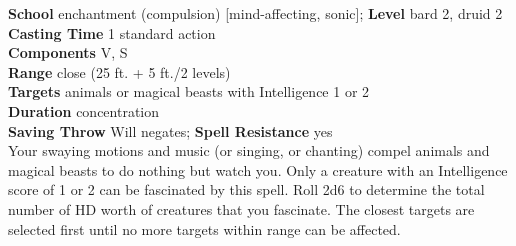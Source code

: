 \textbf{School} enchantment (compulsion) [mind-affecting, sonic]; \textbf{Level} bard 2, druid 2\\
\textbf{Casting Time} 1 standard action\\
\textbf{Components} V, S\\
\textbf{Range} close (25 ft. + 5 ft./2 levels)\\
\textbf{Targets} animals or magical beasts with Intelligence 1 or 2\\
\textbf{Duration} concentration\\
\textbf{Saving Throw }Will negates; \textbf{Spell Resistance} yes\\
Your swaying motions and music (or singing, or chanting) compel animals and magical beasts to do nothing but watch you. Only a creature with an Intelligence score of 1 or 2 can be fascinated by this spell. Roll 2d6 to determine the total number of HD worth of creatures that you fascinate. The closest targets are selected first until no more targets within range can be affected.\\
